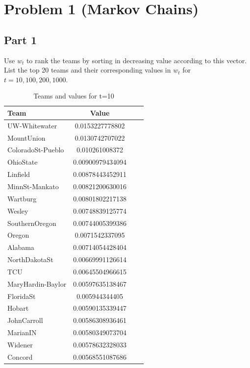 \documentclass[11pt]{article}
\begin{document}

\section*{Problem 1 (Markov Chains)}

\subsection*{Part 1}

Use $w_t$ to rank the teams by sorting in decreasing value according to this vector. List the top 20 teams and their corresponding values in $w_t$ for $t = {10, 100, 200, 1000}$.

\begin{table}[!th]
\centering
\begin{tabular}{|l|c|cl}
\hline
Team & Value \\
\hline
UW-Whitewater & 0.0153227778802 \\
MountUnion & 0.0130742707022 \\
ColoradoSt-Pueblo & 0.010261008372 \\
OhioState & 0.00900979434094 \\
Linfield & 0.00878443452911 \\
MinnSt-Mankato & 0.00821200630016 \\
Wartburg & 0.00801802217138 \\
Wesley & 0.00748839125774 \\
SouthernOregon & 0.00744005399386 \\
Oregon & 0.0071542337095 \\
Alabama & 0.00714054428404 \\
NorthDakotaSt & 0.00669991126614 \\
TCU & 0.00645504966615 \\
MaryHardin-Baylor & 0.00597635138467 \\
FloridaSt & 0.005944344405 \\
Hobart & 0.00590135339447 \\
JohnCarroll & 0.00586308936461 \\
MarianIN & 0.00580349073704 \\
Widener & 0.00578632328033 \\
Concord & 0.00568551087686 \\
\hline
\end{tabular}
\caption{Teams and values for t=10}
\label{ex:table}
\end{table}
\end{document}
